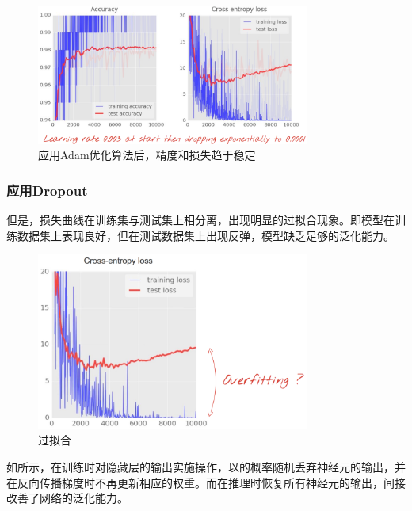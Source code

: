 \begin{content}
\begin{content}
\begin{figure}[H]
\centering
\includegraphics[width=0.8\textwidth]{figures/mnist-apply-learning-rate-decay.png}
\caption{应用Adam优化算法后，精度和损失趋于稳定}
 \label{fig:mnist-apply-learning-rate-decay}
\end{figure}

\subsubsection{应用Dropout}

但是，损失曲线在训练集与测试集上相分离，出现明显的过拟合现象。即模型在训练数据集上表现良好，但在测试数据集上出现反弹，模型缺乏足够的泛化能力。

\begin{figure}[H]
\centering
\includegraphics[width=0.8\textwidth]{figures/mnist-overfitting.png}
\caption{过拟合}
 \label{fig:mnist-overfitting}
\end{figure}

如所示，在训练时对隐藏层的输出实施操作，以的概率随机丢弃神经元的输出，并在反向传播梯度时不再更新相应的权重。而在推理时恢复所有神经元的输出，间接改善了网络的泛化能力。


\end{content}
\end{content}
